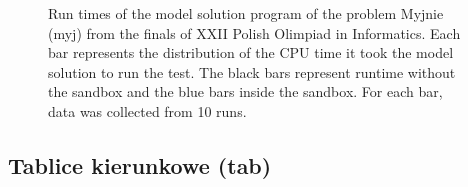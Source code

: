 \documentclass[en]{pracamgr}
\begin{document}
\begin{appendices}
\begin{figure}[H]
\caption{Run times of the model solution program of the problem Myjnie (myj) from the finals of XXII Polish Olimpiad in Informatics. Each bar represents the distribution of the CPU time it took the model solution to run the test. The black bars represent runtime without the sandbox and the blue bars inside the sandbox. For each bar, data was collected from 10 runs.}
\label{figure:myj_model_solution_cpu_time}
\end{figure}

\subsection{Tablice kierunkowe (tab)}


\end{appendices}
\end{document}
